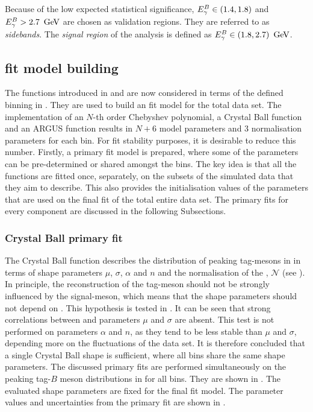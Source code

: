 Because of the low expected statistical significance, ${E^B_{\gamma}}\in(1.4,1.8)$ and ${E^B_{\gamma}}>2.7~\mathrm{\,Ge\kern -0.1em V}$ are chosen as validation regions.
They are referred to as \textit{sidebands}.
The \textit{signal region} of the analysis is defined as ${E^B_{\gamma}}\in(1.8,2.7)~\mathrm{\,Ge\kern -0.1em V}$.

\subsection{\texorpdfstring{\Mbc}{Mbc} fit model building}\label{sec:fitting_setup}

The functions introduced in  and  are now considered in terms of the defined binning in .
They are used to build an \Mbc fit model for the total data set.
The implementation of an $N$-th order Chebyshev polynomial, a Crystal Ball function and an ARGUS function results
in $N+6$ model parameters and 3 normalisation parameters for each \EB bin.
For fit stability purposes, it is desirable to reduce this number.
Firstly, a primary fit model is prepared, where some of the parameters can be pre-determined or shared amongst the bins.
The key idea is that all the functions are fitted once, separately, on the subsets of the simulated data that they aim to describe.
This also provides the initialisation values of the parameters that are used on the final fit of the total entire data set.
The primary fits for every component are discussed in the following Subsections.

\subsubsection{Crystal Ball primary fit}\label{sec:crystal_ball_prefit}

The Crystal Ball function describes the distribution of peaking tag-\B mesons in \Mbc in terms of shape parameters $\mu$, $\sigma$, $\alpha$ and $n$ and the normalisation of the \PDF, $\mathcal{N}$ (see ).
In principle, the reconstruction of the tag-\B meson should not be strongly influenced by the signal-\B meson, which means that the shape parameters should not depend on \EB.
This hypothesis is tested in .
It can be seen that strong correlations between \EB and parameters $\mu$ and $\sigma$ are absent.
This test is not performed on parameters $\alpha$ and $n$, as they tend to be less stable than $\mu$ and $\sigma$, depending more on the fluctuations of the data set.
It is therefore concluded that a single Crystal Ball shape is sufficient, where all \EB bins share the same shape parameters.
The discussed primary fits are performed simultaneously on the peaking tag-$B$ meson \Mbc distributions in \MC for all \EB bins.
They are shown in .
The evaluated shape parameters are fixed for the final \Mbc fit model.
The parameter values and uncertainties from the primary fit are shown in .

